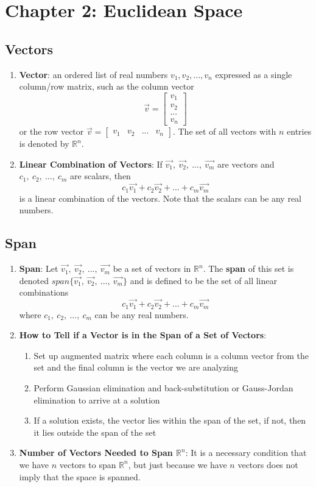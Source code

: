 \documentclass[10pt]{article}
\begin{document}
\section{Chapter 2: Euclidean Space}
\subsection{Vectors}
\begin{enumerate}
\item \textbf{Vector}: an ordered list of real numbers $v_1, v_2, ..., v_n$ expressed as a single column/row matrix, such as the column vector
$$\vec{v} = \begin{bmatrix} v_1 \\ v_2 \\ ... \\ v_n\end{bmatrix}$$
or the row vector $\vec{v} = \begin{bmatrix} v_1 & v_2 & ... & v_n\end{bmatrix}$. The set of all vectors with $n$ entries is denoted by $\mathbb{R}^n$.
\item \textbf{Linear Combination of Vectors}: If $\vec{v_1},\ \vec{v_2},\ ...,\ \vec{v_m}$ are vectors and $c_1,\ c_2,\ ...,\ c_m$ are scalars, then
$$c_1\vec{v_1} + c_2\vec{v_2} + ... + c_m\vec{v_m}$$
is a linear combination of the vectors. Note that the scalars can be any real numbers.
\end{enumerate}
\subsection{Span}
\begin{enumerate}
\item \textbf{Span}: Let $\vec{v_1},\ \vec{v_2},\ ...,\ \vec{v_m}$ be a set of vectors in $\mathbb{R}^n$. The \textbf{span} of this set is denoted $span\lbrace \vec{v_1},\ \vec{v_2},\ ...,\ \vec{v_m} \rbrace$ and is defined to be the set of all linear combinations 
$$c_1\vec{v_1} + c_2\vec{v_2} + ... + c_m\vec{v_m}$$
where $c_1,\ c_2,\ ...,\ c_m$ can be any real numbers.
\item \textbf{How to Tell if a Vector is in the Span of a Set of Vectors}:
\begin{enumerate}
\item Set up augmented matrix where each column is a column vector from the set and the final column is the vector we are analyzing
\item Perform Gaussian elimination and back-substitution or Gauss-Jordan elimination to arrive at a solution
\item If a solution exists, the vector lies within the span of the set, if not, then it lies outside the span of the set
\end{enumerate}
\item \textbf{Number of Vectors Needed to Span $\mathbb{R}^n$}: It is a necessary condition that we have $n$ vectors to span $\mathbb{R}^n$, but just because we have $n$ vectors does not imply that the space is spanned.
\end{enumerate}
\end{document}
